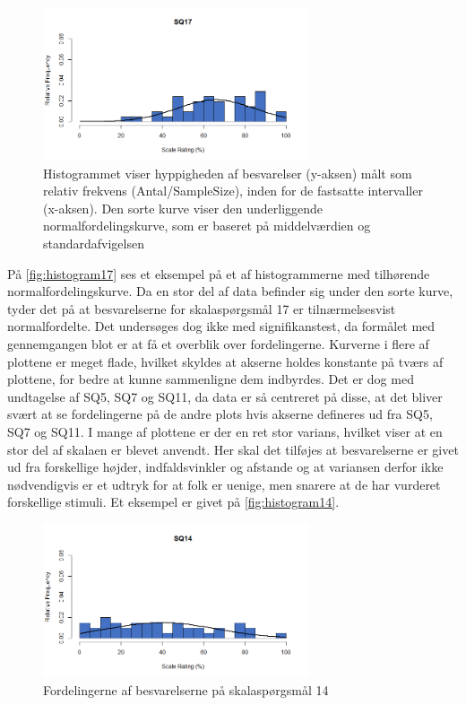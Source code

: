 \begin{figure}[H]
\centering
\includegraphics[width = 0.7\textwidth]{Figure/DatabehandlingSkalaer/HistogramNormalFordeling/SQ17} 
\caption{Histogrammet viser hyppigheden af besvarelser (y-aksen) målt som relativ frekvens (Antal/SampleSize), inden for de fastsatte intervaller (x-aksen). Den sorte kurve viser den underliggende normalfordelingskurve, som er baseret på middelværdien og standardafvigelsen}
\label{fig:histogram17}
\end{figure}
\noindent
%
På \autoref{fig:histogram17} ses et eksempel på et af histogrammerne med tilhørende normalfordelingskurve. Da en stor del af data befinder sig under den sorte kurve, tyder det på at besvarelserne for skalaspørgsmål 17 er tilnærmelsesvist normalfordelte. Det undersøges dog ikke med signifikanstest, da formålet med gennemgangen blot er at få et overblik over fordelingerne.\blankline
%
Kurverne i flere af plottene er meget flade, hvilket skyldes at akserne holdes konstante på tværs af plottene, for bedre at kunne sammenligne dem indbyrdes. Det er dog med undtagelse af SQ5, SQ7 og SQ11, da data er så centreret på disse, at det bliver svært at se fordelingerne på de andre plots hvis akserne defineres ud fra SQ5, SQ7 og SQ11.\blankline
%
I mange af plottene er der en ret stor varians, hvilket viser at en stor del af skalaen er blevet anvendt. Her skal det tilføjes at besvarelserne er givet ud fra forskellige højder, indfaldsvinkler og afstande og at variansen derfor ikke nødvendigvis er et udtryk for at folk er uenige, men snarere at de har vurderet forskellige stimuli. Et eksempel er givet på \autoref{fig:histogram14}.\blankline
%
\begin{figure}[H]
\centering
\includegraphics[width = 0.7\textwidth]{Figure/DatabehandlingSkalaer/HistogramNormalFordeling/SQ14} 
\caption{Fordelingerne af besvarelserne på skalaspørgsmål 14}
\label{fig:histogram14}
\end{figure}
